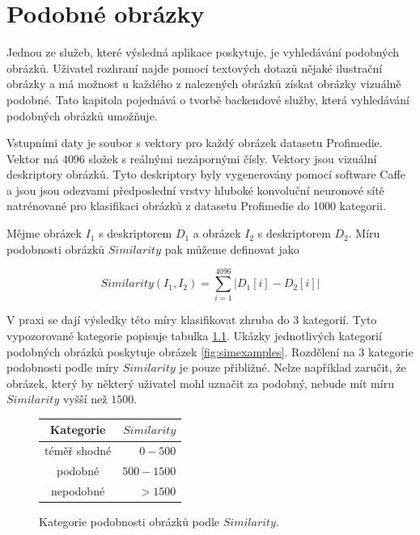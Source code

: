 \chapter{Podobné obrázky}


Jednou ze služeb, které výsledná aplikace poskytuje, je vyhledávání podobných obrázků. Uživatel rozhraní najde pomocí textových dotazů nějaké ilustrační obrázky a má možnost u každého z nalezených obrázků získat obrázky vizuálně podobné. Tato kapitola pojednává o tvorbě backendové služby, která vyhledávání podobných obrázků umožňuje.

Vstupními daty je soubor s vektory pro každý obrázek datasetu Profimedie. Vektor má $4 096$ složek s reálnými nezápornými čísly. Vektory jsou vizuální deskriptory obrázků. Tyto deskriptory byly vygenerovány pomocí software Caffe\cite{caffe} a jsou jsou odezvami předposlední vrstvy hluboké konvoluční neuronové sítě natrénované pro klasifikaci obrázků z datasetu Profimedie do 1000 kategorii.

Mějme obrázek $I_1$ s deskriptorem $D_1$ a obrázek $I_2$ s deskriptorem $D_2$. Míru podobnosti obrázků $Similarity$ pak můžeme definovat jako

\begin{equation}
  Similarity(I_1, I_2) = \sum_{i=1}^{4096} |D_1[i]-D_2[i]|
\end{equation}

V praxi se dají výsledky této míry klasifikovat zhruba do 3 kategorií. Tyto vypozorované kategorie popisuje tabulka \ref{fig:simtypes}. Ukázky jednotlivých kategorií podobných obrázků poskytuje obrázek \ref{fig:simexamples}. Rozdělení na 3 kategorie podobnosti podle míry $Similarity$ je pouze přibližné. Nelze například zaručit, že obrázek, který by některý uživatel mohl uznačit za podobný, nebude mít míru $Similarity$ vyšší než $1 500$.

\begin{figure}[h]
\label{fig:simtypes}
\centering
\begin{tabular}{ | c | r |}
  \hline
     Kategorie & $Similarity$\\
  \hline
  \hline
    téměř shodné & $0 - 500$ \\
  \hline
    podobné & $500 - 1500$ \\
  \hline
    nepodobné & $> 1500$ \\
\hline
\end{tabular}

  \caption{Kategorie podobnosti obrázků podle $Similarity$.}
\end{figure}

